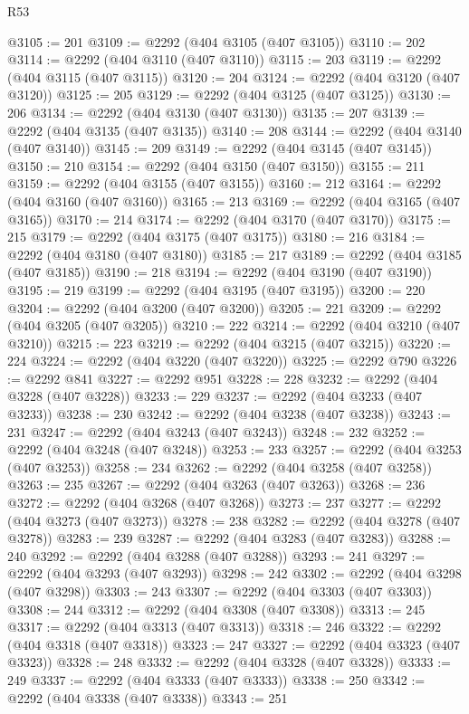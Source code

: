 \begin{lexlean}{R53}
\begin{coremodule}
@3105 := 201
@3109 := @2292 (@404 @3105 (@407 @3105))
@3110 := 202
@3114 := @2292 (@404 @3110 (@407 @3110))
@3115 := 203
@3119 := @2292 (@404 @3115 (@407 @3115))
@3120 := 204
@3124 := @2292 (@404 @3120 (@407 @3120))
@3125 := 205
@3129 := @2292 (@404 @3125 (@407 @3125))
@3130 := 206
@3134 := @2292 (@404 @3130 (@407 @3130))
@3135 := 207
@3139 := @2292 (@404 @3135 (@407 @3135))
@3140 := 208
@3144 := @2292 (@404 @3140 (@407 @3140))
@3145 := 209
@3149 := @2292 (@404 @3145 (@407 @3145))
@3150 := 210
@3154 := @2292 (@404 @3150 (@407 @3150))
@3155 := 211
@3159 := @2292 (@404 @3155 (@407 @3155))
@3160 := 212
@3164 := @2292 (@404 @3160 (@407 @3160))
@3165 := 213
@3169 := @2292 (@404 @3165 (@407 @3165))
@3170 := 214
@3174 := @2292 (@404 @3170 (@407 @3170))
@3175 := 215
@3179 := @2292 (@404 @3175 (@407 @3175))
@3180 := 216
@3184 := @2292 (@404 @3180 (@407 @3180))
@3185 := 217
@3189 := @2292 (@404 @3185 (@407 @3185))
@3190 := 218
@3194 := @2292 (@404 @3190 (@407 @3190))
@3195 := 219
@3199 := @2292 (@404 @3195 (@407 @3195))
@3200 := 220
@3204 := @2292 (@404 @3200 (@407 @3200))
@3205 := 221
@3209 := @2292 (@404 @3205 (@407 @3205))
@3210 := 222
@3214 := @2292 (@404 @3210 (@407 @3210))
@3215 := 223
@3219 := @2292 (@404 @3215 (@407 @3215))
@3220 := 224
@3224 := @2292 (@404 @3220 (@407 @3220))
@3225 := @2292 @790
@3226 := @2292 @841
@3227 := @2292 @951
@3228 := 228
@3232 := @2292 (@404 @3228 (@407 @3228))
@3233 := 229
@3237 := @2292 (@404 @3233 (@407 @3233))
@3238 := 230
@3242 := @2292 (@404 @3238 (@407 @3238))
@3243 := 231
@3247 := @2292 (@404 @3243 (@407 @3243))
@3248 := 232
@3252 := @2292 (@404 @3248 (@407 @3248))
@3253 := 233
@3257 := @2292 (@404 @3253 (@407 @3253))
@3258 := 234
@3262 := @2292 (@404 @3258 (@407 @3258))
@3263 := 235
@3267 := @2292 (@404 @3263 (@407 @3263))
@3268 := 236
@3272 := @2292 (@404 @3268 (@407 @3268))
@3273 := 237
@3277 := @2292 (@404 @3273 (@407 @3273))
@3278 := 238
@3282 := @2292 (@404 @3278 (@407 @3278))
@3283 := 239
@3287 := @2292 (@404 @3283 (@407 @3283))
@3288 := 240
@3292 := @2292 (@404 @3288 (@407 @3288))
@3293 := 241
@3297 := @2292 (@404 @3293 (@407 @3293))
@3298 := 242
@3302 := @2292 (@404 @3298 (@407 @3298))
@3303 := 243
@3307 := @2292 (@404 @3303 (@407 @3303))
@3308 := 244
@3312 := @2292 (@404 @3308 (@407 @3308))
@3313 := 245
@3317 := @2292 (@404 @3313 (@407 @3313))
@3318 := 246
@3322 := @2292 (@404 @3318 (@407 @3318))
@3323 := 247
@3327 := @2292 (@404 @3323 (@407 @3323))
@3328 := 248
@3332 := @2292 (@404 @3328 (@407 @3328))
@3333 := 249
@3337 := @2292 (@404 @3333 (@407 @3333))
@3338 := 250
@3342 := @2292 (@404 @3338 (@407 @3338))
@3343 := 251

\end{coremodule}
\end{lexlean}
